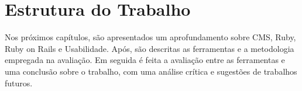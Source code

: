 \chapter{Estrutura do Trabalho}

Nos próximos capítulos, são apresentados um aprofundamento sobre CMS, Ruby, Ruby on Rails e Usabilidade. Após, são descritas as ferramentas e a metodologia empregada na avaliação. Em seguida é feita a avaliação entre as ferramentas e uma conclusão sobre o trabalho, com uma análise crítica e sugestões de trabalhos futuros.



